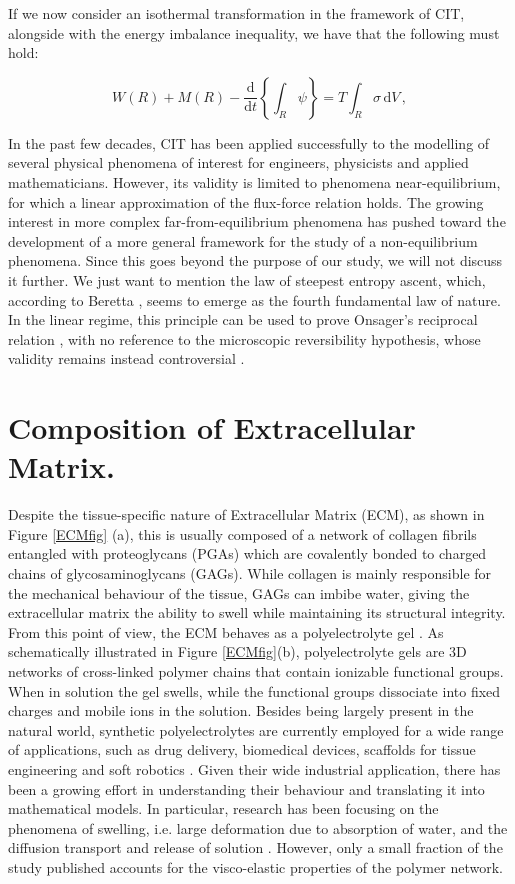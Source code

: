 \documentclass[runningheads]{llncs}
\renewcommand{\d}{\ensuremath{\text{d}}}
\begin{document}
If we now consider an isothermal transformation in the framework of CIT, alongside with the energy imbalance inequality, we have that the following must hold:

\begin{equation}
W(R)+M(R)-\frac{\d}{\d t} \left\{\int_R \psi \right\} = T \int_R \sigma \,\d V\, ,
\label{eqCIT}
\end{equation}

In the past few decades, CIT has been applied successfully to the modelling of several physical phenomena of interest for engineers, physicists and applied mathematicians. However, its validity is limited to phenomena near-equilibrium, for which a linear approximation of the flux-force relation holds. The growing interest in more complex far-from-equilibrium phenomena has pushed toward the development of a more general framework for the study of a non-equilibrium phenomena. Since this goes beyond the purpose of our study, we will not discuss it further. We just want to mention the law of steepest entropy ascent, which, according to Beretta \cite{SEA2}, seems to emerge as the fourth fundamental law of nature. In the linear regime, this principle can be used to prove Onsager's reciprocal relation \cite{SEA1}, with no reference to the microscopic reversibility hypothesis, whose validity remains instead controversial \cite{CIT}.

\section{Composition of Extracellular Matrix.}
\label{ECMcomp}
Despite the tissue-specific nature of Extracellular Matrix (ECM), as shown in Figure \ref{ECMfig} (a), this is usually composed of a network of collagen fibrils entangled with proteoglycans (PGAs) which are covalently bonded to charged chains of glycosaminoglycans (GAGs).  While collagen is mainly responsible for the mechanical behaviour of the tissue, GAGs can imbibe water, giving the extracellular matrix the ability to swell while maintaining its structural integrity. From this point of view, the ECM behaves as a polyelectrolyte gel \cite{ecm1,ecm2}. As schematically illustrated in Figure \ref{ECMfig}(b), polyelectrolyte gels are 3D networks of cross-linked polymer chains that contain ionizable functional groups. When in solution the gel swells, while the functional groups dissociate into fixed charges and mobile ions in the solution. Besides being largely present in the natural world, synthetic polyelectrolytes are currently employed for a wide range of applications, such as drug delivery, biomedical devices, scaffolds for tissue engineering and soft robotics \cite{hydroex3,hydroex2,hydroex1,hydroex4}. Given their wide industrial application, there has been a growing effort in understanding their behaviour and translating it into mathematical models. In particular, research has been focusing on the phenomena of swelling, i.e. large deformation due to absorption of water, and the diffusion transport and release of solution  \cite{DROZDOV+,DROZDOVph,Reviewpolyel,swell2}. However, only a small fraction of the study published accounts for the visco-elastic properties of the polymer network.
\end{document}
